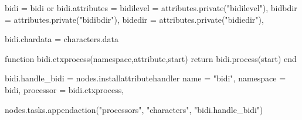 

\startmodule[bidi]

\unprotect

\startluacode

bidi            = bidi or { }
bidi.attributes = {
    bidilevel   = attributes.private("bidilevel"),
    bidbdir     = attributes.private("bidibdir"),
    bidedir     = attributes.private("bidiedir"),
}

bidi.chardata   = characters.data

\stopluacode


\startluacode

function bidi.ctxprocess(namespace,attribute,start)
    return bidi.process(start)
end

bidi.handle_bidi = nodes.installattributehandler {
    name      = "bidi",
    namespace = bidi,
    processor = bidi.ctxprocess,
}

nodes.tasks.appendaction("processors", "characters",  "bidi.handle_bidi")

\stopluacode

\protect \endinput
